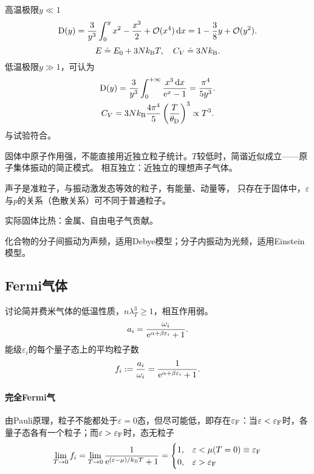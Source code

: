 高温极限$y\ll 1$
\begin{align*}
	\operatorname{D}(y)=\frac3{y^3}\int_0^yx^2-\frac{x^3}2+\mathcal O(x^4)\mathop{}\!\mathrm{d} x=1-\frac38y+\mathcal O(y^2).
\end{align*}
\[
	E\doteq E_0+3Nk_{\mathrm B} T,\quad C_V\doteq 3Nk_{\mathrm B}.
\]
低温极限$y\gg 1$，可认为
\begin{gather}\notag
	\operatorname{D}(y)=\frac3{y^3}\int_0^{+\infty}\frac{x^3\mathop{}\!\mathrm{d} x}{\mathop{}\!\mathrm{e}^ x-1}=\frac{\pi^4}{5y^3}.\\
	C_V=3Nk_{\mathrm B}\frac{4\pi^4}5\left(\frac T{\theta_\mathrm D}\right)^3\propto T^3.\label{CV-Debye}
\end{gather}
与试验符合。
\begin{compactenum}
	\item 固体中原子作用强，不能直接用近独立粒子统计。$T$较低时，简谐近似成立——原子集体振动的简正模式。
	相互独立：近独立的理想声子气体。
	\item 声子是准粒子，与振动激发态等效的粒子，有能量、动量等，
	只存在于固体中，$\varepsilon$与$p$的关系（色散关系）可不同于普通粒子。
	\item 实际固体比热：金属、自由电子气贡献。

	化合物的分子间振动为声频，适用Debye模型；分子内振动为光频，适用Einstein模型。
\end{compactenum}
\subsection{Fermi气体}
讨论简并费米气体的低温性质，$n\lambda_T^3\geqslant 1$，相互作用弱。
\[
	a_i=\frac{\omega_i}{\mathop{}\!\mathrm{e}^{\alpha+\beta\varepsilon_i}+1}.
\]
能级$\varepsilon_i$的每个量子态上的平均粒子数
\[
	f_i:=\frac{a_i}{\omega_i}=\frac1{\mathop{}\!\mathrm{e}^{\alpha+\beta\varepsilon_i}+1}.
\]
\paragraph*{完全Fermi气}由Pauli原理，粒子不能都处于$\varepsilon=0$态，但尽可能低，即存在$\varepsilon_\mathrm F$：当$\varepsilon<\varepsilon_\mathrm F$时，各量子态各有一个粒子；而$\varepsilon>\varepsilon_\mathrm F$时，态无粒子
\[
	\lim_{T\to0}f_i=\lim_{T\to0}\frac1{\mathop{}\!\mathrm{e}^{(\varepsilon-\mu)/k_{\mathrm B} T}+1}=\begin{cases}
	1,&\varepsilon<\mu(T=0)\equiv\varepsilon_\mathrm F\\0,&\varepsilon>\varepsilon_\mathrm F
\end{cases}
\]

